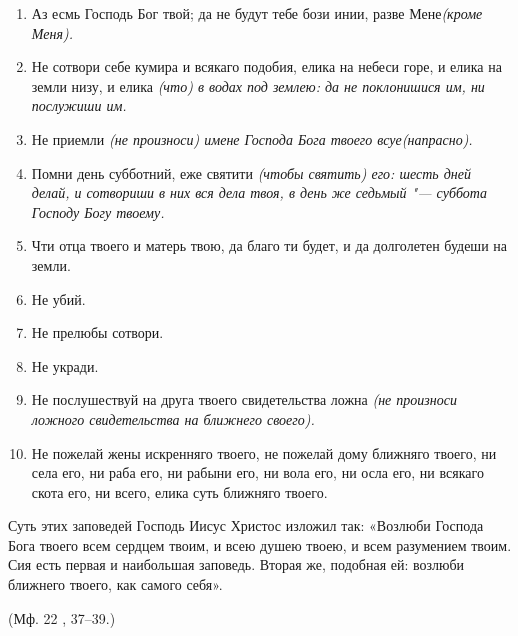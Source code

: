 \begin{enumerate}

\item Аз есмь Господь Бог твой; да не будут тебе бози инии, разве Мене\itshape  (кроме Меня)\normalfont{}.

\item Не сотвори себе кумира и всякаго подобия, елика на небеси горе, и елика на земли низу, и елика \itshape (что)\normalfont{} в водах под землею: да не поклонишися им, ни послужиши им.

\item Не приемли \itshape (не произноси)\normalfont{} имене Господа Бога твоего всуе\itshape  (напрасно)\normalfont{}.

\item Помни день субботний, еже святити \itshape (чтобы святить) \normalfont{}его: шесть дней делай, и сотвориши в них вся дела твоя, в день же седьмый "--- суббота Господу Богу твоему.

\item Чти отца твоего и матерь твою, да благо ти будет, и да долголетен будеши на земли.

\item Не убий.

\item Не прелюбы сотвори.

\item Не укради.

\item Не послушествуй на друга твоего свидетельства ложна \itshape (не произноси ложного свидетельства на ближнего своего)\normalfont{}.

\item Не пожелай жены искренняго твоего, не пожелай дому ближняго твоего, ни села его, ни раба его, ни рабыни его, ни вола его, ни осла его, ни всякаго скота его, ни всего, елика суть ближняго твоего.

\end{enumerate}


Суть этих заповедей Господь Иисус Христос изложил так: «Возлюби Господа Бога твоего всем сердцем твоим, и всею душею твоею, и всем разумением твоим. Сия есть первая и наибольшая заповедь. Вторая же, подобная ей: возлюби ближнего твоего, как самого себя».

(Мф. 22 , 37--39.) 
\mychapterending

 


